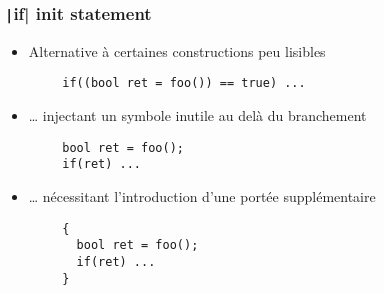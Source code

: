 \documentclass[C++.tex]{subfiles}
\begin{document}
\begin{frame}[fragile]
	\frametitle{\texttt|if| init statement}
	\begin{itemize}
		\item Alternative à certaines constructions peu lisibles
	\end{itemize}

	\begin{verbatim}
		if((bool ret = foo()) == true) ...
	\end{verbatim}

	\begin{itemize}
		\item \ldots{} injectant un symbole inutile au delà du branchement
	\end{itemize}

	\begin{verbatim}
		bool ret = foo();
		if(ret) ...
	\end{verbatim}

	\begin{itemize}
		\item \ldots{} nécessitant l'introduction d'une portée supplémentaire
	\end{itemize}

	\begin{verbatim}
		{
		  bool ret = foo();
		  if(ret) ...
		}
	\end{verbatim}

\end{frame}
\end{document}
